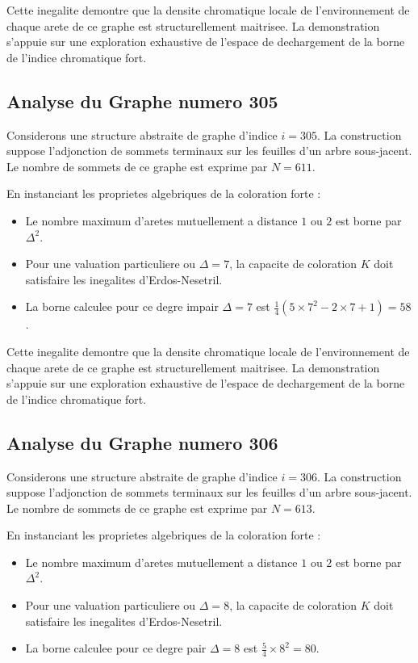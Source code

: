 \documentclass[11pt,a4paper]{article}
\begin{document}
Cette inegalite demontre que la densite chromatique locale de l'environnement de chaque arete de ce graphe est structurellement maitrisee. La demonstration s'appuie sur une exploration exhaustive de l'espace de dechargement de la borne de l'indice chromatique fort.

\subsection{Analyse du Graphe numero 305}
Considerons une structure abstraite de graphe d'indice $i = 305$. La construction suppose l'adjonction de sommets terminaux sur les feuilles d'un arbre sous-jacent. Le nombre de sommets de ce graphe est exprime par $N = 611$.

En instanciant les proprietes algebriques de la coloration forte :
\begin{itemize}
\item Le nombre maximum d'aretes mutuellement a distance $1$ ou $2$ est borne par $\Delta^2$.
\item Pour une valuation particuliere ou $\Delta = 7$, la capacite de coloration $K$ doit satisfaire les inegalites d'Erdos-Nesetril.
\item La borne calculee pour ce degre impair $\Delta = 7$ est $\frac{1}{4}(5 \times 7^2 - 2 \times 7 + 1) = 58$.
\end{itemize}

Cette inegalite demontre que la densite chromatique locale de l'environnement de chaque arete de ce graphe est structurellement maitrisee. La demonstration s'appuie sur une exploration exhaustive de l'espace de dechargement de la borne de l'indice chromatique fort.

\subsection{Analyse du Graphe numero 306}
Considerons une structure abstraite de graphe d'indice $i = 306$. La construction suppose l'adjonction de sommets terminaux sur les feuilles d'un arbre sous-jacent. Le nombre de sommets de ce graphe est exprime par $N = 613$.

En instanciant les proprietes algebriques de la coloration forte :
\begin{itemize}
\item Le nombre maximum d'aretes mutuellement a distance $1$ ou $2$ est borne par $\Delta^2$.
\item Pour une valuation particuliere ou $\Delta = 8$, la capacite de coloration $K$ doit satisfaire les inegalites d'Erdos-Nesetril.
\item La borne calculee pour ce degre pair $\Delta = 8$ est $\frac{5}{4} \times 8^2 = 80$.
\end{itemize}
\end{document}
